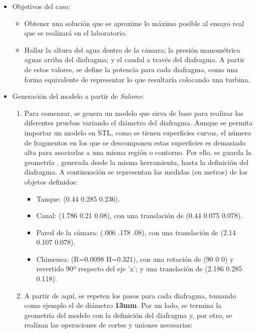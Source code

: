 \begin{itemize}
\item
  Objetivos del caso:

  \begin{itemize}
  \item
    Obtener una solución que se aproxime lo máximo posible al ensayo
    real que se realizará en el laboratorio.
  \item
    Hallar la altura del agua dentro de la cámara; la presión
    manométrica aguas arriba del diafragma; y el caudal a través del
    diafragma. A partir de estos valores, se define la potencia para
    cada diafragma, como una forma equivalente de representar lo que
    resultaría colocando una turbina.
  \end{itemize}
\item
  Generación del modelo a partir de \emph{Salome}:

  \begin{enumerate}
  \def\labelenumi{\arabic{enumi}.}
  \item
    Para comenzar, se genera un modelo que sirva de base para realizar
    las diferentes pruebas variando el diámetro del diafragma. Aunque se
    permita importar un modelo en STL, como se tienen superficies
    curvas, el número de fragmentos en los que se descomponen estas
    superficies es demasiado alta para asociarlas a una misma región o
    contorno. Por ello, se guarda la geometría , generada desde la misma
    herramienta, hasta la definición del diafragma. A continuación se
    representan las medidas (en metros) de los objetos definidos:

    \begin{itemize}
    \item
      Tanque: (0.44 0.285 0.236).
    \item
      Canal: (1.786 0.21 0.08), con una translación de (0.44 0.075
      0.078).
    \item
      Pared de la cámara: (.006 .178 .08), con una translación de (2.14
      0.107 0.078).
    \item
      Chimenea: (R=0.0098 H=0.321), con una rotación de (90 0 0) y
      revertido 90º respecto del eje 'x'; y una translación de (2.186
      0.285 0.118).
    \end{itemize}
  \item
    A partir de aquí, se repeten los pasos para cada diafragma, tomando
    como ejemplo el de diámetro \textbf{13mm}. Por un lado, se termina
    la geometría del modelo con la definición del diafragma y, por otro,
    se realizan las operaciones de cortes y uniones necesarias:


\end{enumerate}
\end{itemize}
